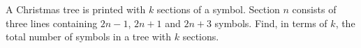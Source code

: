 A Christmas tree is printed with $k$ sections of a symbol. Section $n$ consists of three lines containing $2n-1$, $2n+1$ and $2n+3$ symbols. Find, in terms of $k$, the total number of symbols in a tree with $k$ sections.
